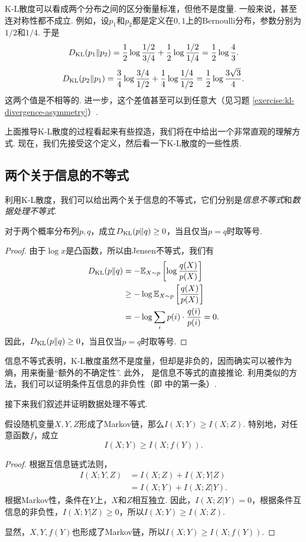 K-L散度可以看成两个分布之间的区分衡量标准，但他不是度量. 一般来说，甚至连对称性都不成立. 例如，设$p_1$和$p_2$都是定义在$0,1$上的Bernoulli分布，参数分别为$1/2$和$1/4$. 于是
\[D_{\mathrm{KL}}(p_1\Vert p_2) = \frac12\log\frac{1/2}{3/4} + \frac12\log\frac{1/2}{1/4} = \frac12\log\frac43.\]
\[D_{\mathrm{KL}}(p_2\Vert p_1) = \frac34\log\frac{3/4}{1/2} + \frac14\log\frac{1/4}{1/2} = \frac12\log\frac{3\sqrt3}{4}.\]
这两个值是不相等的. 进一步，这个差值甚至可以到任意大（见习题 \ref{exercise:kl-divergence-asymmetry}）.

上面推导K-L散度的过程看起来有些捏造，我们将在中给出一个非常直观的理解方式. 现在，我们先接受这个定义，然后看一下K-L散度的一些性质.

\subsection{两个关于信息的不等式}
利用K-L散度，我们可以给出两个关于信息的不等式，它们分别是\textit{信息不等式}和\textit{数据处理不等式}.

\begin{theorem}[信息不等式]\label{thm:information-inequality}
    对于两个概率分布列$p,q$，成立$D_{\mathrm{KL}}(p\Vert q)\geq0$，当且仅当$p=q$时取等号.
\end{theorem}
\begin{proof}
    由于$\log x$是凸函数，所以由Jensen不等式，我们有
    \begin{align*}
        D_{\mathrm{KL}}(p\Vert q)&=-\mathbb{E}_{X\sim p}\left[\log\frac{q(X)}{p(X)}\right]\\
        &\geq-\log \mathbb{E}_{X\sim p}\left[\frac{q(X)}{p(X)}\right]\\
        &=-\log\sum_ip(i)\cdot\frac{q(i)}{p(i)}=0.
    \end{align*}
    因此，$D_{\mathrm{KL}}(p\Vert q)\geq0$，当且仅当$p=q$时取等号.
\end{proof}

信息不等式表明，K-L散度虽然不是度量，但却是非负的，因而确实可以被作为熵，用来衡量“额外的不确定性”. 此外， 是信息不等式的直接推论. 利用类似的方法，我们可以证明条件互信息的非负性（即 中的第一条）.

接下来我们叙述并证明数据处理不等式.
\begin{theorem}[数据处理不等式]\label{thm:data-processing-inequality}
    假设随机变量$X,Y,Z$形成了Markov链，那么$I(X;Y)\geq I(X;Z)$. 特别地，对任意函数$f$，成立
    \[I(X;Y)\geq I(X;f(Y)).\]
\end{theorem}
\begin{proof}
根据互信息链式法则，
    \begin{align*}
        I(X;Y,Z)&=I(X;Z)+I(X;Y|Z)\\
        &=I(X;Y)+I(X;Z|Y).
    \end{align*}
根据Markov性，条件在$Y$上，$X$和$Z$相互独立. 因此，$I(X;Z|Y)=0$，根据条件互信息的非负性，$I(X;Y|Z)\geq0$，所以$I(X;Y)\geq I(X;Z)$.

显然，$X,Y,f(Y)$也形成了Markov链，所以$I(X;Y)\geq I(X;f(Y))$.
\end{proof}

